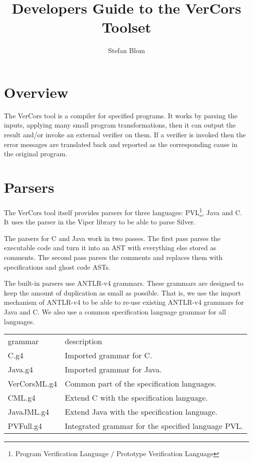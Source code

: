 \documentclass{report}
\author{Stefan Blom}
\title{Developers Guide to the VerCors Toolset}
\begin{document}
\maketitle

\tableofcontents

\chapter{Overview}

The VerCors tool is a compiler for specified programs. It works by 
parsing the inputs, applying many small program transformations,
then it can output the result and/or invoke an external verifier on them.
If a verifier is invoked then the error messages are translated back
and reported as the corresponding cause in the original program.

\chapter{Parsers}

The VerCors tool itself provides parsers for three languages:
PVL\footnote{Program Verification Language / Prototype Verification Language}, Java and C.
It uses the parser in the Viper library to be able to parse Silver.

The parsers for C and Java work in two passes. The first pass parses the executable code
and turn it into an AST with everything else stored as comments. The second pass
parses the comments and replaces them with specifications and ghost code ASTs.

The built-in parsers use ANTLR-v4 grammars. These grammars are designed
to keep the amount of duplication as small as possible. That is, we use
the import mechanism of ANTLR-v4 to be able to re-use
existing ANTLR-v4 grammars for Java and C. We also use a common specification
language grammar for all languages.

\par\noindent\begin{tabularx}{\textwidth}{lX}
grammar & description
\\
C.g4 & Imported grammar for C.
\\
Java.g4 & Imported grammar for Java.
\\
VerCorsML.g4 & Common part of the specification languages.
\\
CML.g4 & Extend C with the specification language.
\\
JavaJML.g4 & Extend Java with the specification language.
\\
PVFull.g4 & Integrated grammar for the specified language PVL.
\end{tabularx}
\end{document}
